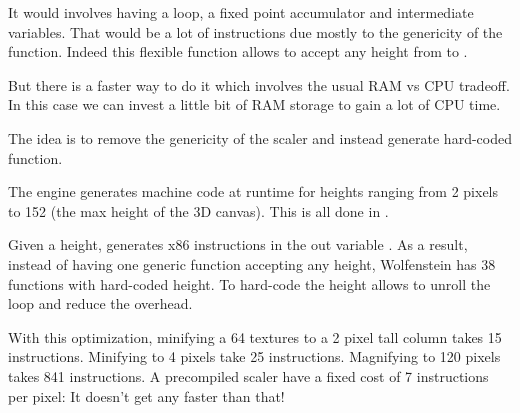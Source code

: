 \par
\begin{minipage}{\textwidth}

\end{minipage}

\par
It would involves having a loop, a fixed point accumulator and intermediate variables. That would be a lot of instructions due mostly to the genericity of the function. Indeed this flexible function allows  to accept any height from  to .\\
\par
 But there is a faster way to do it which involves the usual RAM vs CPU tradeoff. In this case we can invest a little bit of RAM storage to gain a lot of CPU time.\\
 \par 
 The idea is to remove the genericity of the scaler and instead generate hard-coded function.
\par
\begin{minipage}{\textwidth}

\end{minipage}

 The engine generates machine code at runtime for heights ranging from 2 pixels to 152 (the max height of the 3D canvas). This is all done in .\\
\par
\begin{minipage}{\textwidth}

\end{minipage}
\par
Given a height,  generates x86 instructions in the out variable . As a result, instead of having one generic function accepting any height,  Wolfenstein has 38 functions with hard-coded height. To hard-code the height allows to unroll the loop and reduce the overhead.\\
\par
With this optimization, minifying a 64 textures to a 2 pixel tall column takes 15 instructions. Minifying to 4 pixels take 25 instructions. Magnifying to 120 pixels takes 841 instructions. A precompiled scaler have a fixed cost of 7 instructions per pixel: It doesn't get any faster than that!\\

